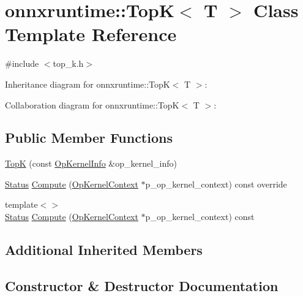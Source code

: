 \hypertarget{classonnxruntime_1_1TopK}{}\section{onnxruntime\+:\+:TopK$<$ T $>$ Class Template Reference}
\label{classonnxruntime_1_1TopK}


{\ttfamily \#include $<$top\+\_\+k.\+h$>$}



Inheritance diagram for onnxruntime\+:\+:TopK$<$ T $>$\+:


Collaboration diagram for onnxruntime\+:\+:TopK$<$ T $>$\+:
\subsection*{Public Member Functions}
\begin{DoxyCompactItemize}
\item 
\mbox{\hyperlink{classonnxruntime_1_1TopK_a4dec7bcf27069f00c81094c6f65133b9}{TopK}} (const \mbox{\hyperlink{classonnxruntime_1_1OpKernelInfo}{Op\+Kernel\+Info}} \&op\+\_\+kernel\+\_\+info)
\item 
\mbox{\hyperlink{classonnxruntime_1_1common_1_1Status}{Status}} \mbox{\hyperlink{classonnxruntime_1_1TopK_a0acd7025a833f51d22a0bc5ad6ec6c48}{Compute}} (\mbox{\hyperlink{classonnxruntime_1_1OpKernelContext}{Op\+Kernel\+Context}} $\ast$p\+\_\+op\+\_\+kernel\+\_\+context) const override
\item 
{\footnotesize template$<$$>$ }\\\mbox{\hyperlink{classonnxruntime_1_1common_1_1Status}{Status}} \mbox{\hyperlink{classonnxruntime_1_1TopK_ab26bb94db8038c225e7efc2339fc4bfd}{Compute}} (\mbox{\hyperlink{classonnxruntime_1_1OpKernelContext}{Op\+Kernel\+Context}} $\ast$p\+\_\+op\+\_\+kernel\+\_\+context) const
\end{DoxyCompactItemize}
\subsection*{Additional Inherited Members}


\subsection{Constructor \& Destructor Documentation}
\mbox{\label{classonnxruntime_1_1TopK_a4dec7bcf27069f00c81094c6f65133b9}} 
